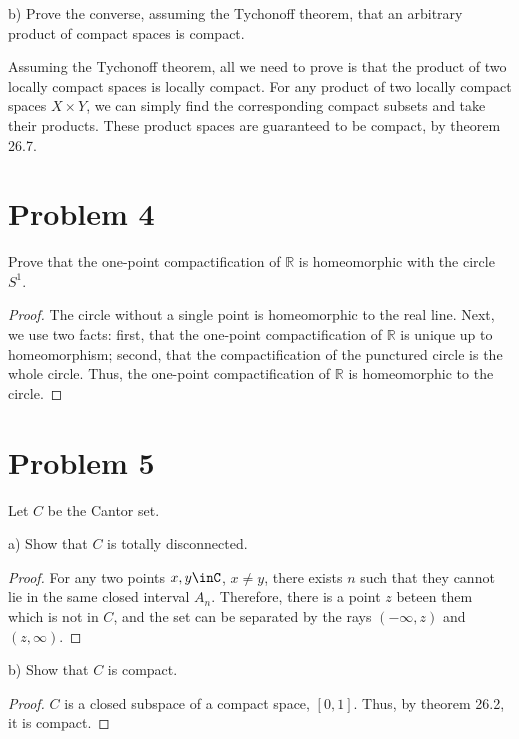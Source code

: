 \documentclass[11pt]{article}
\begin{document}
b) Prove the converse, assuming the Tychonoff theorem, that an arbitrary product
of compact spaces is compact. 

Assuming the Tychonoff theorem, all we need to prove is that the product of two
locally compact spaces is locally compact. For any product of two locally
compact spaces \(X\times Y\), we can simply find the corresponding compact subsets
and take their products. These product spaces are guaranteed to be compact, by
theorem 26.7. 

\section{Problem 4}
\label{sec:org7e398e4}
Prove that the one-point compactification of \(\mathbb{R}\) is homeomorphic with
the circle \(S^1\).

\begin{proof}
The circle without a single point is homeomorphic to the real line. Next, we use
two facts: first, that the one-point compactification of \(\mathbb{R}\) is unique
up to homeomorphism; second, that the compactification of the punctured circle
is the whole circle. Thus, the one-point compactification of \(\mathbb{R}\) is
homeomorphic to the circle. 
\end{proof}

\section{Problem 5}
\label{sec:org15f736d}
Let \(C\) be the Cantor set. 

a) Show that \(C\) is totally disconnected.

\begin{proof}
For any two points \(x,y\inC\), \(x\not = y\), there exists \(n\) such that they cannot
lie in the same closed interval \(A_n\). Therefore, there is a point \(z\) beteen
them which is not in \(C\), and the set can be separated by the rays \((-\infty,
z)\) and \((z, \infty)\).  
\end{proof}

b) Show that \(C\) is compact. 

\begin{proof}
\(C\) is a closed subspace of a compact space, \([0,1]\). Thus, by theorem 26.2, it
is compact. 
\end{proof}
\end{document}
